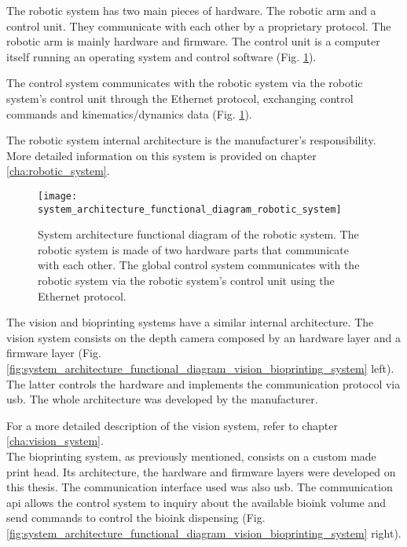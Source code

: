 The robotic system has two main pieces of hardware. The robotic arm and a control unit. They communicate with each other by a proprietary protocol. The robotic arm is mainly hardware and firmware. The control unit is a computer itself running an operating system and control software (Fig. \ref{fig:system_architecture_functional_diagram_robotic_system}).

The control system communicates with the robotic system via the robotic system's control unit through the Ethernet protocol, exchanging control commands and kinematics/dynamics data (Fig. \ref{fig:system_architecture_functional_diagram_robotic_system}).

The robotic system internal architecture is the manufacturer's responsibility. More detailed information on this system is provided on chapter \ref{cha:robotic_system}.

\begin{figure}[htbp]
	\centering
	\texttt{[image: system\_architecture\_functional\_diagram\_robotic\_system]}
	\caption{System architecture functional diagram of the robotic system. The robotic system is made of two hardware parts that communicate with each other. The global control system communicates with the robotic system via the robotic system's control unit using the Ethernet protocol.}
	\label{fig:system_architecture_functional_diagram_robotic_system}
\end{figure}

The vision and bioprinting systems have a similar internal architecture. The vision system consists on the depth camera composed by an hardware layer and a firmware layer (Fig. \ref{fig:system_architecture_functional_diagram_vision_bioprinting_system} left). The latter controls the hardware and implements the communication protocol via \gls{usb}. The whole architecture was developed by the manufacturer.

For a more detailed description of the vision system, refer to chapter \ref{cha:vision_system}.\\

The bioprinting system, as previously mentioned, consists on a custom made print head. Its architecture, the hardware and firmware layers were developed on this thesis. The communication interface used was also \gls{usb}. The communication \gls{api} allows the control system to inquiry about the available bioink volume and send commands to control the bioink dispensing (Fig. \ref{fig:system_architecture_functional_diagram_vision_bioprinting_system} right).

